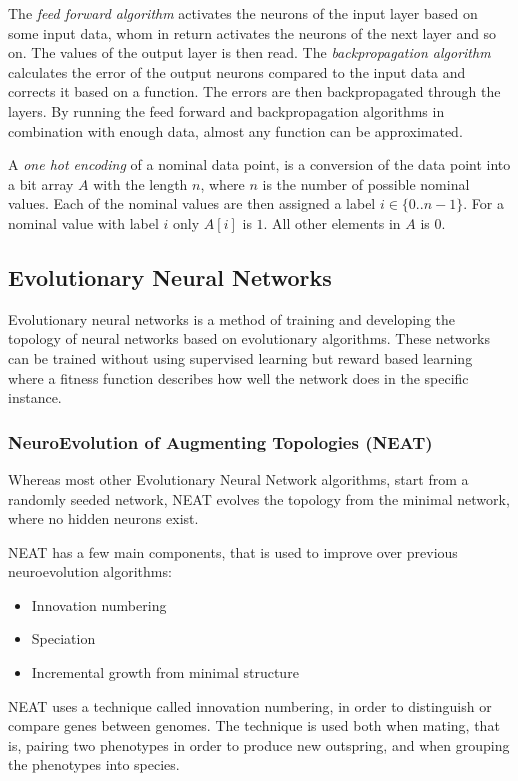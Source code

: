 \newpar The \textit{feed forward algorithm} activates the neurons of the input layer based on some input data, whom in return activates the neurons of the next layer and so on. The values of the output layer is then read. The \textit{backpropagation algorithm} calculates the error of the output neurons compared to the input data and corrects it based on a function. The errors are then backpropagated through the layers. By running the feed forward and backpropagation algorithms in combination with enough data, almost any function can be approximated.

\newpar A \textit{one hot encoding} of a nominal data point, is a conversion of the data point into a bit array $A$ with the length $n$, where $n$ is the number of possible nominal values. Each of the nominal values are then assigned a label $i \in \{0 .. n-1\}$. For a nominal value with label $i$ only $ A[i] $ is $1$. All other elements in $A$ is $0$.

\subsection{Evolutionary Neural Networks}
Evolutionary neural networks is a method of training and developing the topology of neural networks based on evolutionary algorithms. These networks can be trained without using supervised learning but reward based learning where a fitness function describes how well the network does in the specific instance. 

\subsubsection{NeuroEvolution of Augmenting Topologies (NEAT)}
Whereas most other Evolutionary Neural Network algorithms, start from a randomly seeded network, NEAT evolves the topology from the minimal network, where no hidden neurons exist.

\newpar NEAT has a few main components, that is used to improve over previous neuroevolution algorithms:

\begin{itemize}
	\item Innovation numbering
	\item Speciation
	\item Incremental growth from minimal structure
\end{itemize}

\newpar NEAT uses a technique called innovation numbering, in order to distinguish or compare genes between genomes. The technique is used both when mating, that is, pairing two phenotypes in order to produce new outspring, and when grouping the phenotypes into species.

